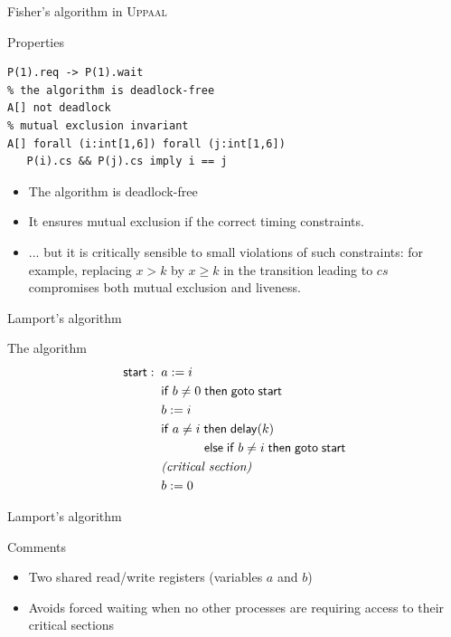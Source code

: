 \documentclass[aspectratio=169]{beamer}
\begin{document}
\begin{frame}[fragile]{Fisher's algorithm in \textsc{Uppaal}}
\small

\begin{block}{Properties}
\begin{lstlisting}[emph={[2]forall,not}]
% P(1) requests access => it will eventually wait
P(1).req -> P(1).wait
% the algorithm is deadlock-free
A[] not deadlock
% mutual exclusion invariant
A[] forall (i:int[1,6]) forall (j:int[1,6])
   P(i).cs && P(j).cs imply i == j  
\end{lstlisting}
\end{block}

\begin{itemize}
\item The algorithm is \alert{deadlock-free}
\item It ensures  mutual exclusion if the correct timing constraints. 
\item ... but it is critically sensible to  small violations of such constraints: for example, replacing $x > k$ by 
$x \geq k$ in the transition leading to $cs$ compromises both \alert{mutual exclusion} and \alert{liveness}.
\end{itemize}
\end{frame}


\begin{slide}{Lamport's algorithm}
\small

\begin{block}{The algorithm}
\begin{align*}
\mathsf{start}: \; \;  &  a := i\\
& \mathsf{if}\; b \neq 0\; \mathsf{then\; goto\; start}\\
& b := i \\
& \mathsf{if}\; a \neq i\; \mathsf{then\; delay}(k)\\
& \hspace{12mm} \mathsf{else} \; \mathsf{if}\; b \neq i\; \mathsf{then\; goto\; start}\\
& \text{\emph{(critical section)}}\\
& b := 0
\end{align*}
\end{block}
\end{slide}

\begin{slide}{Lamport's algorithm}
\small
\begin{block}{Comments}
\begin{itemize}
\item Two shared read/write registers (variables $a$ and $b$)
\item Avoids \alert{forced waiting} when no other processes are requiring access to their critical sections
\end{itemize}
\end{block}
\end{slide}
\end{document}
